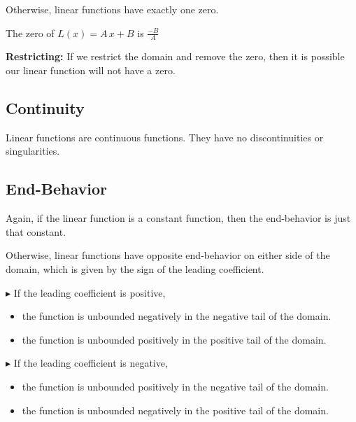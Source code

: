 \documentclass{ximera}
\begin{document}
Otherwise, linear functions have exactly one zero. 

The zero of $L(x) = A \, x + B $ is $\frac{-B}{A}$


\textbf{Restricting:} If we restrict the domain and remove the zero, then it is possible our linear function will not have a zero.









\subsection*{Continuity}

Linear functions are continuous functions.  They have no discontinuities or singularities. 






\subsection*{End-Behavior}


Again, if the linear function is a constant function, then the end-behavior is just that constant. 



Otherwise, linear functions have opposite end-behavior on either side of the domain, which is given by the sign of the leading coefficient. 


$\blacktriangleright$ If the leading coefficient is positive,

     \begin{itemize}
          \item the function is unbounded negatively in the negative tail of the domain.
          \item the function is unbounded positively in the positive tail of the domain.
     \end{itemize}
  



$\blacktriangleright$ If the leading coefficient is negative,
     \begin{itemize}
          \item the function is unbounded positively in the negative tail of the domain.
          \item the function is unbounded negatively in the positive tail of the domain.
     \end{itemize}
\end{document}
